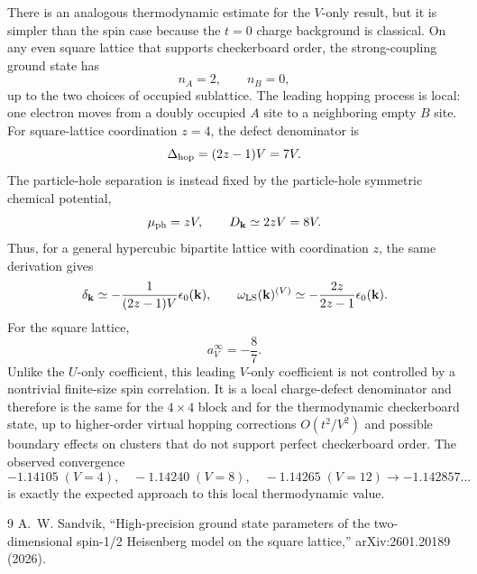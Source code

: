 \documentclass[11pt]{article}
\newcommand{\eps}{\epsilon_0({\bf k})}
\newcommand{\wls}{\omega_{\rm LS}({\bf k})}
\newcommand{\dd}{\delta_{\bf k}}
\newcommand{\Dk}{D_{\bf k}}
\begin{document}
There is an analogous thermodynamic estimate for the $V$-only result, but it is simpler than the
spin case because the $t=0$ charge background is classical.  On any even square lattice that
supports checkerboard order, the strong-coupling ground state has
\begin{equation}
  n_A=2,\qquad n_B=0,
\end{equation}
up to the two choices of occupied sublattice.  The leading hopping process is local: one electron
moves from a doubly occupied $A$ site to a neighboring empty $B$ site.  For square-lattice
coordination $z=4$, the defect denominator is
\begin{equation}
  \Delta_{\rm hop}=(2z-1)V=7V.
\end{equation}
The particle-hole separation is instead fixed by the particle-hole symmetric chemical potential,
\begin{equation}
  \mu_{\rm ph}=zV,
  \qquad
  \Dk\simeq 2zV=8V.
\end{equation}
Thus, for a general hypercubic bipartite lattice with coordination $z$, the same derivation gives
\begin{equation}
  \dd\simeq -\frac{1}{(2z-1)V}\eps,
  \qquad
  \wls^{(V)}\simeq -\frac{2z}{2z-1}\eps.
\end{equation}
For the square lattice,
\begin{equation}
  \boxed{a_V^{\infty}=-\frac{8}{7}.}
\end{equation}
Unlike the $U$-only coefficient, this leading $V$-only coefficient is not controlled by a
nontrivial finite-size spin correlation.  It is a local charge-defect denominator and therefore is
the same for the $4\times4$ block and for the thermodynamic checkerboard state, up to higher-order
virtual hopping corrections $O(t^2/V^2)$ and possible boundary effects on clusters that do not
support perfect checkerboard order.  The observed convergence
\begin{equation}
  -1.14105\;(V=4),\quad -1.14240\;(V=8),\quad -1.14265\;(V=12)
  \longrightarrow -1.142857\ldots
\end{equation}
is exactly the expected approach to this local thermodynamic value.

\begin{thebibliography}{9}
A.~W. Sandvik, ``High-precision ground state parameters of the two-dimensional spin-1/2
Heisenberg model on the square lattice,'' arXiv:2601.20189 (2026).
\end{thebibliography}
\end{document}
